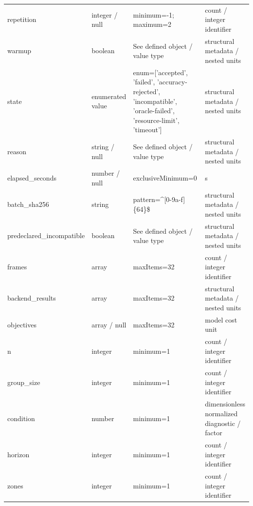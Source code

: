 \begin{longtable}{@{}>{\raggedright\arraybackslash}p{}>{\raggedright\arraybackslash}p{}>{\raggedright\arraybackslash}p{}>{\raggedright\arraybackslash}p{}@{}}
repetition & integer /\allowbreak{} null & minimum=\allowbreak{}-1; maximum=\allowbreak{}2 & count /\allowbreak{} integer identifier\\
warmup & boolean & See defined object /\allowbreak{} value type & structural metadata /\allowbreak{} nested units\\
state & enumerated value & enum=\allowbreak{}['accepted', 'failed', 'accuracy-\allowbreak{}rejected', 'incompatible', 'oracle-\allowbreak{}failed', 'resource-\allowbreak{}limit', 'timeout'] & structural metadata /\allowbreak{} nested units\\
reason & string /\allowbreak{} null & See defined object /\allowbreak{} value type & structural metadata /\allowbreak{} nested units\\
elapsed\_\allowbreak{}seconds & number /\allowbreak{} null & exclusiveMinimum=\allowbreak{}0 & s\\
batch\_\allowbreak{}sha256 & string & pattern=\allowbreak{}\textasciicircum{}[0-9a-\allowbreak{}f]\{64\}\$ & structural metadata /\allowbreak{} nested units\\
predeclared\_\allowbreak{}incompatible & boolean & See defined object /\allowbreak{} value type & structural metadata /\allowbreak{} nested units\\
frames & array & maxItems=\allowbreak{}32 & count /\allowbreak{} integer identifier\\
backend\_\allowbreak{}results & array & maxItems=\allowbreak{}32 & structural metadata /\allowbreak{} nested units\\
objectives & array /\allowbreak{} null & maxItems=\allowbreak{}32 & model cost unit\\
n & integer & minimum=\allowbreak{}1 & count /\allowbreak{} integer identifier\\
group\_\allowbreak{}size & integer & minimum=\allowbreak{}1 & count /\allowbreak{} integer identifier\\
condition & number & minimum=\allowbreak{}1 & dimensionless normalized diagnostic /\allowbreak{} factor\\
horizon & integer & minimum=\allowbreak{}1 & count /\allowbreak{} integer identifier\\
zones & integer & minimum=\allowbreak{}1 & count /\allowbreak{} integer identifier\\
\end{longtable}\endgroup
